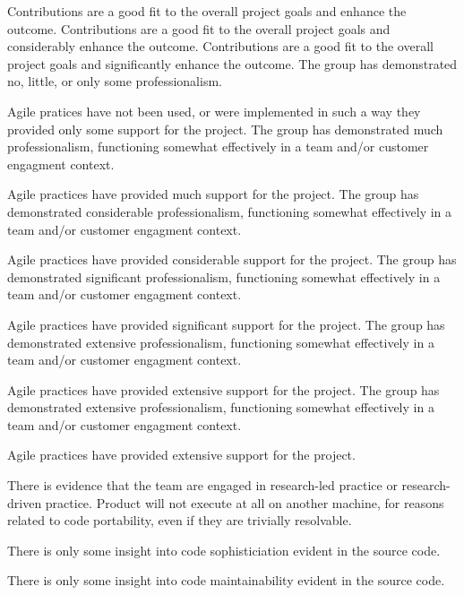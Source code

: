 \documentclass{../../fal_assignment}
\begin{document}
\begin{markingrubric}
        \grade Contributions are a good fit to the overall project goals and enhance the outcome.
        \grade Contributions are a good fit to the overall project goals and considerably enhance the outcome.
        \grade Contributions are a good fit to the overall project goals and significantly enhance the outcome.
%
        \grade\fail The group has demonstrated no, little, or only some professionalism.
            \par Agile pratices have not been used, or were implemented in such a way they provided only some support for the project. 
        \grade The group has demonstrated much professionalism, functioning somewhat effectively in a team and/or customer engagment context.
            \par Agile practices have provided much support for the project.
        \grade The group has demonstrated considerable professionalism, functioning somewhat effectively in a team and/or customer engagment context.
            \par Agile practices have provided considerable support for the project.
        \grade The group has demonstrated significant professionalism, functioning somewhat effectively in a team and/or customer engagment context.
            \par Agile practices have provided significant support for the project.
        \grade The group has demonstrated extensive professionalism, functioning somewhat effectively in a team and/or customer engagment context.
            \par Agile practices have provided extensive support for the project.
        \grade The group has demonstrated extensive professionalism, functioning somewhat effectively in a team and/or customer engagment context.
            \par Agile practices have provided extensive support for the project.
            \par There is evidence that the team are engaged in research-led practice or research-driven practice.
%
        \grade\fail Product will not execute at all on another machine, for reasons related to code portability, even if they are trivially resolvable.
            \par There is only some insight into code sophisticiation evident in the source code.
            \par There is only some insight into code maintainability evident in the source code.

\end{markingrubric}
\end{document}
